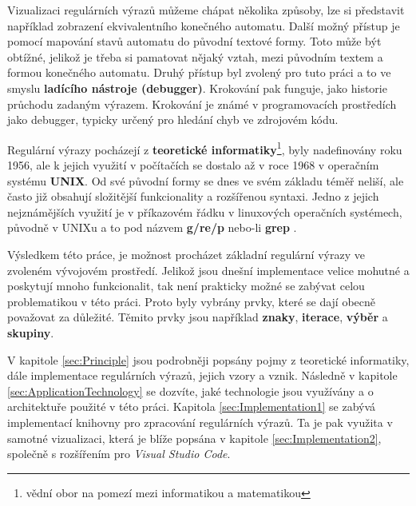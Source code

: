 Vizualizaci regulárních výrazů můžeme chápat několika způsoby, 
lze si představit například zobrazení ekvivalentního konečného automatu.
Další možný přístup je pomocí mapování stavů automatu do původní textové formy. 
Toto může být obtížné, jelikož je třeba si pamatovat nějaký vztah, 
mezi původním textem a formou konečného automatu. 
Druhý přístup byl zvolený pro tuto
práci a to ve smyslu \textbf{ladícího nástroje (debugger)}. Krokování pak funguje, jako historie průchodu zadaným výrazem. 
Krokování je známé v programovacích prostředích jako debugger,
typicky určený pro hledání chyb ve zdrojovém kódu.

Regulární výrazy pocházejí z \textbf{teoretické informatiky}\footnote{vědní obor na pomezí mezi informatikou a matematikou}, 
byly nadefinovány roku 1956, ale k jejich využití v počítačích se dostalo až v roce 1968 v operačním systému \textbf{UNIX}.
Od své původní formy se dnes ve svém základu téměř neliší, ale často již obsahují složitější funkcionality a rozšířenou syntaxi.
Jedno z jejich nejznámějších využití je v příkazovém řádku v linuxových operačních systémech, původně v UNIXu a to pod názvem \textbf{g/re/p} nebo-li \textbf{grep} 
\cite{Wikipedia_2024}. 

Výsledkem této práce, je možnost procházet základní regulární výrazy ve zvoleném vývojovém prostředí. 
Jelikož jsou dnešní implementace velice mohutné a poskytují mnoho funkcionalit, tak není prakticky možné
se zabývat celou problematikou v této práci. 
Proto byly vybrány prvky, které se dají obecně považovat za důležité. 
Těmito prvky jsou například \textbf{znaky}, \textbf{iterace}, \textbf{výběr} a \textbf{skupiny}.

V kapitole \ref{sec:Principle} jsou podrobněji popsány pojmy z teoretické informatiky, dále implementace regulárních výrazů, jejich vzory a vznik.
Následně v kapitole \ref{sec:ApplicationTechnology} se dozvíte, jaké technologie jsou využívány a o architektuře použité v této práci.
Kapitola \ref{sec:Implementation1} se zabývá implementací knihovny pro zpracování regulárních výrazů. 
Ta je pak využita v samotné vizualizaci, která je blíže popsána v kapitole \ref{sec:Implementation2}, společně s rozšířením pro \textit{Visual Studio Code}.

\endinput